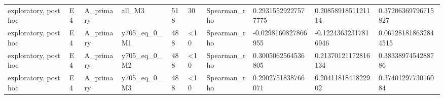\begin{tabular}{llllllllll}
exploratory, post hoc & E4 & A\_primary & all\_M3 & 518 & 30 & Spearman\_rho & 0.29315529227577775 & 0.2085891851121114 & 0.37206369796715827 \\
exploratory, post hoc & E4 & A\_primary & y705\_eq\_0\_M1 & 488 & <10 & Spearman\_rho & -0.0298160827866955 & -0.12243632317816946 & 0.061281818632844515 \\
exploratory, post hoc & E4 & A\_primary & y705\_eq\_0\_M2 & 488 & <10 & Spearman\_rho & 0.3005062564536805 & 0.21370121172816134 & 0.3833897454288786 \\
exploratory, post hoc & E4 & A\_primary & y705\_eq\_0\_M3 & 488 & <10 & Spearman\_rho & 0.2902751838766071 & 0.2041181841822902 & 0.3740129773016084 \\
\bottomrule
\end{tabular}
